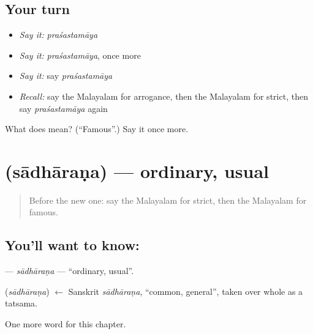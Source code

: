 \subsection*{Your turn}
\begin{itemize}
\raggedright
  \item \emph{Say it:} \emph{praśastamāya}
  \item \emph{Say it:} \emph{praśastamāya}, once more
  \item \emph{Say it:} say \emph{praśastamāya}
  \item \emph{Recall:} say the Malayalam for arrogance, then the Malayalam for strict, then say \emph{praśastamāya} again
\end{itemize}

\begin{tcolorbox}[breakable,colback=teal!4,colframe=teal!35!black,title={Before you move on}]
What does  mean? (\textquotedblleft{}Famous\textquotedblright{}.) Say it once more.
\end{tcolorbox}
\section[\texorpdfstring{\ml{സാധാരണ} (sādhāraṇa)}{സാധാരണ (sādhāraṇa)}]{ (sādhāraṇa) — ordinary, usual}

\label{lesson:ML-C320-sadharana}



\begin{quote}
Before the new one: say the Malayalam for strict, then the Malayalam for famous.
\end{quote}

\subsection*{You'll want to know: }
\textbf{} — \emph{sādhāraṇa} — \textquotedblleft{}ordinary, usual\textquotedblright{}.

\begin{cousinweb}
\textbf{} (\emph{sādhāraṇa}) $\leftarrow$ Sanskrit \emph{sādhāraṇa}, \textquotedblleft{}common, general\textquotedblright{}, taken over whole as a tatsama.
\end{cousinweb}

\begin{grammarlens}[title={What you've built}]
One more word for this chapter.
\end{grammarlens}

